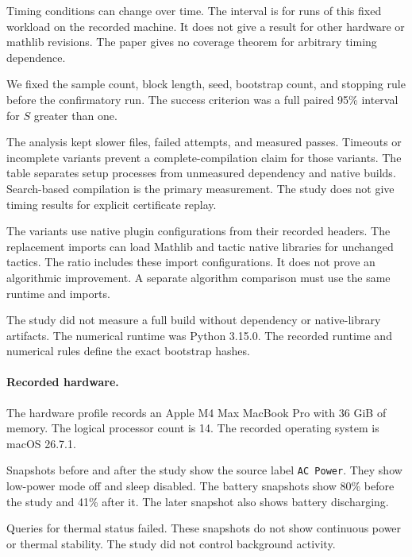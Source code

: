 Timing conditions can change over time.
The interval is for runs of this fixed workload on the recorded machine.
It does not give a result for other hardware or mathlib revisions.
The paper gives no coverage theorem for arbitrary timing dependence.

We fixed the sample count, block length, seed, bootstrap count, and stopping rule before the confirmatory run.
The success criterion was a full paired 95\% interval for $S$ greater than one.


\FloatBarrier

The analysis kept slower files, failed attempts, and measured passes.
Timeouts or incomplete variants prevent a complete-compilation claim for those variants.
The table separates setup processes from unmeasured dependency and native builds.
Search-based compilation is the primary measurement.
The study does not give timing results for explicit certificate replay.


\FloatBarrier

The variants use native plugin configurations from their recorded headers.
The replacement imports can load Mathlib and tactic native libraries for unchanged tactics.
The ratio includes these import configurations.
It does not prove an algorithmic improvement.
A separate algorithm comparison must use the same runtime and imports.

The study did not measure a full build without dependency or native-library artifacts.
The numerical runtime was Python 3.15.0.
The recorded runtime and numerical rules define the exact bootstrap hashes.

\paragraph{Recorded hardware.}
The hardware profile records an Apple M4 Max MacBook Pro with 36 GiB of memory.
The logical processor count is 14.
The recorded operating system is macOS 26.7.1.

Snapshots before and after the study show the source label \texttt{AC Power}.
They show low-power mode off and sleep disabled.
The battery snapshots show 80\% before the study and 41\% after it.
The later snapshot also shows battery discharging.

Queries for thermal status failed.
These snapshots do not show continuous power or thermal stability.
The study did not control background activity.

